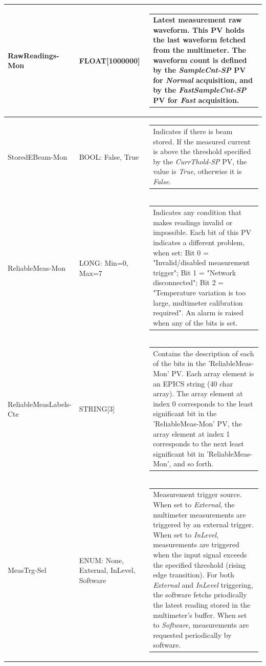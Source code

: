 \documentclass[openany]{article}
\begin{document}
\begin{longtable}{| m{3.0cm} m{4.5cm} m{7.0cm} |}
		RawReadings-Mon & FLOAT[1000000] & \begin{tabular}{@{}m{6cm}@{}}
	    					Latest measurement raw waveform. This PV holds the last waveform fetched from the multimeter. The waveform count is defined by the \emph{SampleCnt-SP} PV for \emph{Normal} acquisition, and by the \emph{FastSampleCnt-SP} PV for \emph{Fast} acquisition.
						\end{tabular} \\ \hline
		StoredEBeam-Mon & BOOL: False, True & \begin{tabular}{@{}m{6cm}@{}}
	    					Indicates if there is beam stored. If the measured current is above the threshold specified by the \emph{CurrThold-SP} PV, the value is \emph{True}, otherwise it is \emph{False}.
						\end{tabular} \\ \hline
		ReliableMeas-Mon & LONG: Min=0, Max=7 & \begin{tabular}{@{}m{6cm}@{}}
	    					Indicates any condition that makes readings invalid or impossible. Each bit of this PV indicates a different problem, when set: Bit 0 = "Invalid/disabled measurement trigger"; Bit 1 = "Network disconnected"; Bit 2 = "Temperature variation is too large, multimeter calibration required". An alarm is raised when any of the bits is set.
						\end{tabular} \\ \hline
		ReliableMeasLabels-Cte & STRING[3] & \begin{tabular}{@{}m{6cm}@{}}
	    					Contains the description of each of the bits in the 'ReliableMeas-Mon' PV. Each array element is an EPICS string (40 char array). The array element at index 0 corresponds to the least significant bit in the 'ReliableMeas-Mon' PV, the array element at index 1 corresponds to the next least significant bit in 'ReliableMeas-Mon', and so forth.
						\end{tabular} \\ \hline
		MeasTrg-Sel & ENUM: None, External, InLevel, Software & \begin{tabular}{@{}m{6cm}@{}}
				      	  Measurement trigger source. When set to \emph{External}, the multimeter measurements are triggered by an external trigger. When set to \emph{InLevel}, measurements are triggered when the input signal exceeds the specified threshold (rising edge transition). For both \emph{External} and \emph{InLevel} triggering, the software fetchs priodically the latest reading stored in the multimeter's buffer. When set to \emph{Software}, measurements are requested periodically by software.

\end{tabular}
\end{longtable}
\end{document}

